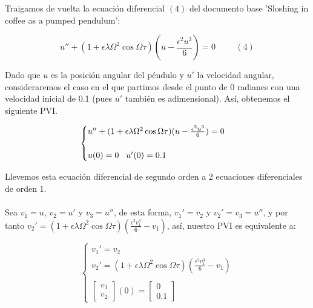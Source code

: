 \documentclass{article}
\begin{document}
Traigamos de vuelta la ecuación diferencial $(4)$ del documento base 'Sloshing in coffee as a pumped pendulum':

\[
u''+(1+\epsilon\lambda\Omega^{2}\cos{\Omega\tau})(u-\frac{\epsilon^2u^3}{6})=0 \hspace{1cm}(4)
\]

Dado que $u$ es la posición angular del péndulo y $u'$ la velocidad angular, consideraremos el caso en el que partimos desde el punto de 0 radianes con una velocidad inicial de 0.1 (pues $u'$ también es adimensional). Así, obtenemos el siguiente PVI.

\[
\begin{cases}
    u''+(1+\epsilon\lambda\Omega^{2}\cos{\Omega\tau})(u-\frac{\epsilon^2u^3}{6})=0\\ \\
    u(0)=0\hspace{0.3cm}u'(0)=0.1
\end{cases}
\]

Llevemos esta ecuación diferencial de segundo orden a 2 ecuaciones diferenciales de orden 1.\\
\\
Sea $v_1=u$, $v_2=u'$ y $v_3=u''$, de esta forma, $v_1'=v_2$ y $v_2'=v_3=u''$, y por tanto $v_2'=(1+\epsilon\lambda\Omega^{2}\cos{\Omega\tau})(\frac{\epsilon^2v_1^3}{6}-v_1)$, así, nuestro PVI es equivalente a:

\[
\begin{cases}
v_1'=v_2\\
v_2'=(1+\epsilon\lambda\Omega^{2}\cos{\Omega\tau})(\frac{\epsilon^2v_1^3}{6}-v_1)\\ \\
\begin{bmatrix}
    v_1\\
    v_2
\end{bmatrix}
(0)=
\begin{bmatrix}
    0\\
    0.1
\end{bmatrix}
\end{cases}
\]
\end{document}

